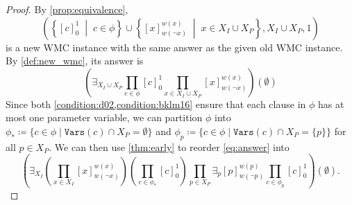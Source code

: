 \documentclass{article}
\theoremstyle{definition}
\theoremstyle{remark}
\begin{document}
\begin{proof}
  By \cref{prop:equivalence},
  \begin{equation}
    \left(\left\{[c]_0^1 \;\middle|\; c \in \phi\right\} \cup \left\{[x]_{w(\neg
          x)}^{w(x)} \;\middle|\; x \in X_I \cup X_P\right\}, X_I \cup X_P,
      1\right) \label{eq:new_wmc}
  \end{equation}
  is a new WMC instance with the same answer as the given old WMC instance. By
  \cref{def:new_wmc}, its answer is
  \begin{equation} \label{eq:answer}
    \left(\exists_{X_I \cup X_P} \prod_{c \in \phi} [c]_0^1 \prod_{x \in X_I
        \cup X_P} [x]_{w(\neg x)}^{w(x)} \right)(\emptyset)
  \end{equation}
  Since both \cref{condition:d02,condition:bklm16} ensure that each clause in
  $\phi$ has at most one parameter variable, we can partition $\phi$ into
  $\phi_* \coloneqq \{c \in \phi \mid \mathtt{Vars}(c) \cap X_P = \emptyset \}$
  and $\phi_p \coloneqq \{ c \in \phi \mid \mathtt{Vars}(c) \cap X_P = \{ p \}
  \}$ for all $p \in X_P$. We can then use \cref{thm:early} to reorder
  \cref{eq:answer} into
  \[
    \left(\exists_{X_I} \left( \prod_{x \in X_I} [x]_{w(\neg x)}^{w(x)} \right)
      \left( \prod_{c \in \phi_*} [c]_0^1 \right) \prod_{p \in X_P} \exists_p
      [p]_{w(\neg p)}^{w(p)} \prod_{c \in \phi_p} [c]_0^1 \right)(\emptyset).
  \]


\end{proof}
\end{document}
